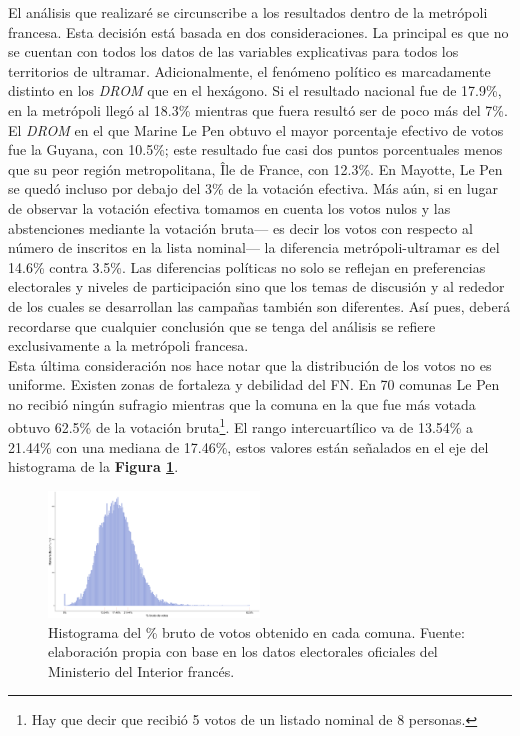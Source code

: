 El análisis que realizaré se circunscribe a los resultados dentro de la metrópoli francesa. Esta decisión está basada en dos consideraciones. La principal es que no se cuentan con todos los datos de las variables explicativas para todos los territorios de ultramar. Adicionalmente, el fenómeno político es marcadamente distinto en los \textit{DROM} que en el hexágono. Si el resultado nacional fue de 17.9\%, en la metrópoli llegó al 18.3\% mientras que fuera resultó ser de poco más del 7\%. El \textit{DROM} en el que Marine Le Pen obtuvo el mayor porcentaje efectivo de votos fue la Guyana, con 10.5\%; este resultado fue casi dos puntos porcentuales menos que su peor región metropolitana, Île de France, con 12.3\%. En Mayotte, Le Pen se quedó incluso por debajo del 3\% de la votación efectiva. Más aún, si en lugar de observar la votación efectiva tomamos en cuenta los votos nulos y las abstenciones mediante la votación bruta--- es decir los votos con respecto al número de inscritos en la lista nominal--- la diferencia metrópoli-ultramar es del 14.6\% contra 3.5\%. Las diferencias políticas no solo se reflejan en preferencias electorales y niveles de participación sino que los temas de discusión y al rededor de los cuales se desarrollan las campañas también son diferentes. Así pues, deberá recordarse que cualquier conclusión que se tenga del análisis se refiere exclusivamente a la metrópoli francesa.\\

Esta última consideración nos hace notar que la distribución de los votos no es uniforme. Existen zonas de fortaleza y debilidad del FN. En 70 comunas Le Pen no recibió ningún sufragio mientras que la comuna en la que fue más votada obtuvo 62.5\% de la votación bruta\footnote{Hay que decir que recibió 5 votos de un listado nominal de 8 personas.}. El rango intercuartílico va de 13.54\% a 21.44\% con una mediana de 17.46\%, estos valores están señalados en el eje del histograma de la \textbf{Figura \ref{fig:Distr_Br}}. 

\begin{figure}[h]
	\centering
	\includegraphics[width = 0.5\textwidth]{Figs/AED/Distr_Votos_Br_P12_FN}
	\caption{Histograma del \% bruto de votos obtenido en cada comuna. Fuente: elaboración propia con base en los datos electorales oficiales del Ministerio del Interior francés.}
	\label{fig:Distr_Br}	
\end{figure}

